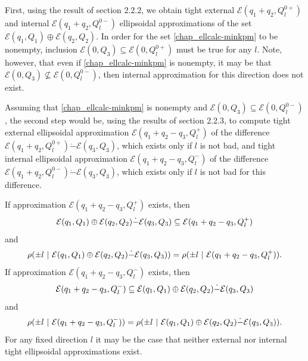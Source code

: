 \documentclass[letterpaper,10pt,english]{sphinxmanual}
\begin{document}
First, using the result of section 2.2.2, we obtain tight external
${\mathcal E}(q_1+q_2,Q_l^{0+})$ and internal
${\mathcal E}(q_1+q_2,Q_l^{0-})$ ellipsoidal approximations of the
set ${\mathcal E}(q_1,Q_1)\oplus{\mathcal E}(q_2,Q_2)$. In order
for the set \eqref{chap_ellcalc-minkpm} to be nonempty, inclusion
${\mathcal E}(0,Q_3)\subseteq{\mathcal E}(0,Q_l^{0+})$ must be
true for any $l$. Note, however, that even if \eqref{chap_ellcalc-minkpm} is
nonempty, it may be that
${\mathcal E}(0,Q_3)\not\subseteq{\mathcal E}(0,Q_l^{0-})$, then
internal approximation for this direction does not exist.

Assuming that \eqref{chap_ellcalc-minkpm} is nonempty and
${\mathcal E}(0,Q_3)\subseteq{\mathcal E}(0,Q_l^{0-})$, the second
step would be, using the results of section 2.2.3, to compute tight
external ellipsoidal approximation
${\mathcal E}(q_1+q_2-q_3,Q_l^+)$ of the difference
${\mathcal E}(q_1+q_2,Q_l^{0+})\dot{-}{\mathcal E}(q_3,Q_3)$,
which exists only if $l$ is not bad, and tight internal
ellipsoidal approximation ${\mathcal E}(q_1+q_2-q_3,Q_l^-)$ of the
difference
${\mathcal E}(q_1+q_2,Q_l^{0-})\dot{-}{\mathcal E}(q_3,Q_3)$,
which exists only if $l$ is not bad for this difference.

If approximation ${\mathcal E}(q_1+q_2-q_3,Q_l^+)$ exists, then
\begin{gather}
\begin{split}{\mathcal E}(q_1,Q_1)\oplus{\mathcal E}(q_2,Q_2)\dot{-}{\mathcal E}(q_3,Q_3) \subseteq
{\mathcal E}(q_1+q_2-q_3,Q_l^+)\end{split}\notag
\end{gather}
and
\begin{gather}
\begin{split}\rho(\pm l ~|~ {\mathcal E}(q_1,Q_1)\oplus{\mathcal E}(q_2,Q_2)\dot{-}{\mathcal E}(q_3,Q_3)) =
\rho(\pm l ~|~ {\mathcal E}(q_1+q_2-q_3,Q_l^+)).\end{split}\notag
\end{gather}
If approximation ${\mathcal E}(q_1+q_2-q_3,Q_l^-)$ exists, then
\begin{gather}
\begin{split}{\mathcal E}(q_1+q_2-q_3,Q_l^-) \subseteq
{\mathcal E}(q_1,Q_1)\oplus{\mathcal E}(q_2,Q_2)\dot{-}{\mathcal E}(q_3,Q_3)\end{split}\notag
\end{gather}
and
\begin{gather}
\begin{split}\rho(\pm l ~|~{\mathcal E}(q_1+q_2-q_3,Q_l^-)) =
\rho(\pm l ~|~ {\mathcal E}(q_1,Q_1)\oplus{\mathcal E}(q_2,Q_2)\dot{-}{\mathcal E}(q_3,Q_3)) .\end{split}\notag
\end{gather}
For any fixed direction $l$ it may be the case that neither
external nor internal tight ellipsoidal approximations exist.
\end{document}
